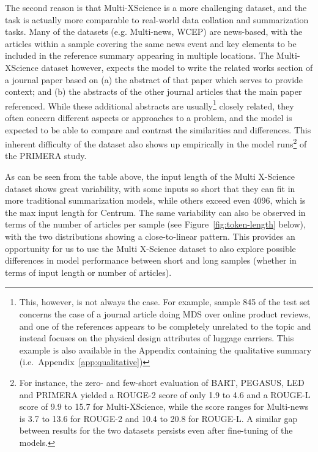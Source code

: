 \documentclass[12pt, twocolumn]{article}
\numberwithin{equation}{section}
\begin{document}
The second reason is that Multi-XScience is a more challenging dataset, and the task is actually more comparable to real-world data collation and summarization tasks.   Many of the datasets (e.g. Multi-news, WCEP) are news-based, with the articles within a sample covering the same news event and key elements to be included in the reference summary appearing in multiple locations.  The Multi-XScience dataset however, expects the model to write the related works section of a journal paper based on (a) the abstract of that paper which serves to provide context; and (b) the abstracts of the other journal articles that the main paper referenced.  While these additional abstracts are usually\footnote{This, however, is not always the case.  For example, sample 845 of the test set concerns the case of a journal article doing MDS over online product reviews, and one of the references appears to be completely unrelated to the topic and instead focuses on the physical design attributes of luggage carriers.  This example is also available in the Appendix containing the qualitative summary (i.e.~Appendix~\ref{app:qualitative})} closely related, they often concern different aspects or approaches to a problem, and the model is expected to be able to compare and contrast the similarities and differences.  This inherent difficulty of the dataset also shows up empirically in the model runs\footnote{For instance, the zero- and few-short evaluation of BART, PEGASUS, LED and PRIMERA yielded a ROUGE-2 score of only 1.9 to 4.6 and a ROUGE-L score of 9.9 to 15.7 for Multi-XScience, while the score ranges for Multi-news is 3.7 to 13.6 for ROUGE-2 and 10.4 to 20.8 for ROUGE-L.  A similar gap between results for the two datasets persists even after fine-tuning of the models.} of the PRIMERA study.

As can be seen from the table above, the input length of the Multi X-Science dataset shows great variability, with some inputs so short that they can fit in more traditional summarization models, while others exceed even 4096, which is the max input length for Centrum.  The same variability can also be observed in terms of the number of articles per sample (see Figure~\ref{fig:token-length} below), with the two distributions showing a close-to-linear pattern.  This provides an opportunity for us to use the Multi X-Science dataset to also explore possible differences in model performance between short and long samples (whether in terms of input length or number of articles). 
\end{document}
